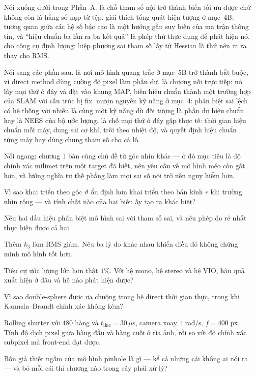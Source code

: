 \documentclass[../../vslam.tex]{subfiles}
\begin{document}
Nối xuống dưới trong Phần~A.  là chỗ tham số nội trở thành biến tối ưu được chứ không còn là hằng số nạp từ tệp.  giải thích tổng quát hiện tượng ở mục~4B: tương quan giữa các hệ số bậc cao là một hướng gần suy biến của ma trận thông tin, và ``hiệu chuẩn ba lần ra ba kết quả'' là phép thử thực dụng để phát hiện nó.  cho công cụ định lượng: hiệp phương sai tham số lấy từ Hessian là thứ nên in ra thay cho RMS.

Nối sang các phần sau.  là nơi mô hình quang trắc ở mục~5B trở thành bắt buộc, vì direct method dùng cường độ pixel làm phần dư.  là chương nối trực tiếp: nó lấy mọi thứ ở đây và đặt vào khung MAP, biến hiệu chuẩn thành một trường hợp của SLAM với cấu trúc bị fix.  mượn nguyên kỹ năng ở mục~4: phân biệt sai lệch có hệ thống với nhiễu là cùng một kỹ năng dù đối tượng là phần dư hiệu chuẩn hay là NEES của bộ ước lượng.  là chỗ mọi thứ ở đây gặp thực tế: thời gian hiệu chuẩn mỗi máy, dung sai cơ khí, trôi theo nhiệt độ, và quyết định hiệu chuẩn từng máy hay dùng chung tham số cho cả lô.

Nối ngang:  chương 1 bàn cùng chủ đề từ góc nhìn khác --- ở đó mục tiêu là độ chính xác milimet trên một target đã biết, nên yêu cầu về mô hình méo còn gắt hơn, và lưỡng nghĩa tư thế phẳng làm mọi sai số nội trở nên nguy hiểm hơn.

\begin{tukiem}
\item Vì sao khai triển theo góc \(\vartheta\) ổn định hơn khai triển theo bán kính \(r\) khi trường nhìn rộng --- và tính chất nào của hai biến ấy tạo ra khác biệt?
\item Nêu hai dấu hiệu phân biệt mô hình sai với tham số sai, và nêu phép đo rẻ nhất thực hiện được cả hai.
\item Thêm \(k_3\) làm RMS giảm. Nêu ba lý do khác nhau khiến điều đó không chứng minh mô hình tốt hơn.
\item Tiêu cự ước lượng lớn hơn thật \(1\%\). Với hệ mono, hệ stereo và hệ VIO, hậu quả xuất hiện ở đâu và hệ nào phát hiện được?
\item Vì sao double-sphere được ưa chuộng trong hệ direct thời gian thực, trong khi Kannala--Brandt chính xác không kém?
\item Rolling shutter với \(480\) hàng và \(t_{\text{line}} = 30\,\mu\)s, camera xoay \(1\) rad/s, \(f = 400\) px. Tính độ dịch pixel giữa hàng đầu và hàng cuối ở rìa ảnh, rồi so với độ chính xác subpixel mà front-end đạt được.
\item Bốn giả thiết ngầm của mô hình pinhole là gì --- kể cả những cái không ai nói ra --- và bỏ mỗi cái thì chương nào trong cây phải xử lý?
\end{tukiem}
\ifSubfilesClassLoaded{\printbibliography[title={Nguồn}]}{}
\end{document}
